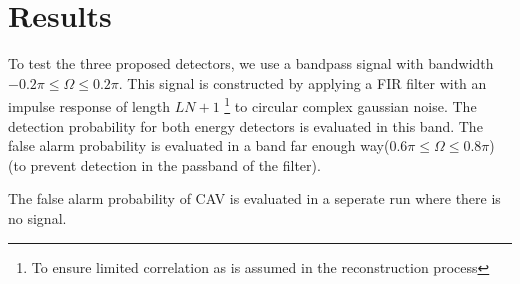 \documentclass[a4paper, openany, oneside]{memoir}
\begin{document}
\section{Results}

To test the three proposed detectors, we use a bandpass signal with bandwidth $-0.2\pi \leq \Omega \leq 0.2\pi$. This signal is constructed by applying a FIR filter with an impulse response of length $LN+1$ \footnote{To ensure limited correlation as is assumed in the reconstruction process} to circular complex gaussian noise. The detection probability for both energy
detectors is evaluated in this band. The false alarm probability is evaluated in a band far enough way($0.6\pi \leq \Omega \leq 0.8\pi$) (to prevent detection in the passband of the filter).

The false alarm probability of CAV is evaluated in a seperate run where there is no signal.

\end{document}
